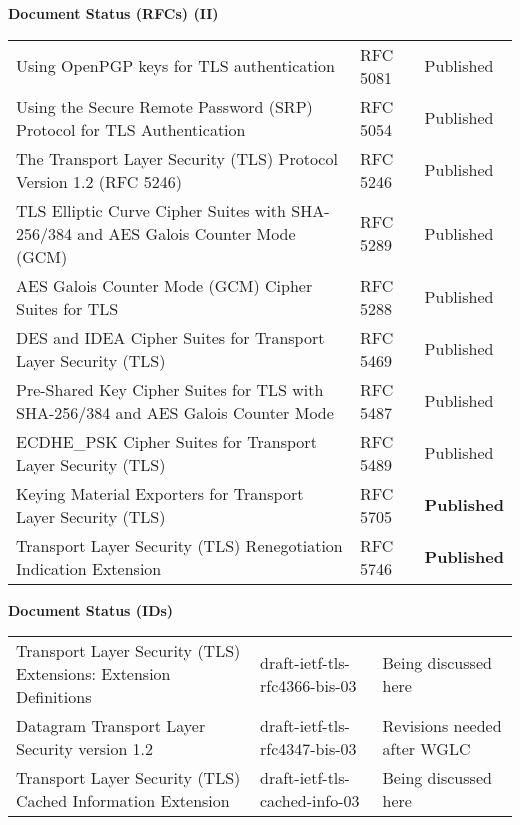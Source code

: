 \documentclass[helvetica]{seminar}
\newcommand{\heading}[1]{%
  \begin{center} 
    \large\bf 
    #1 
  \end{center} 
  \vspace{.4 in}}
\begin{document}
\begin{slide}
\heading{Document Status (RFCs) (II)}

{\tiny
\begin{tabular}{|p{1.5 in}|p{1.4 in}|p{.7 in}|}
\hline
Using OpenPGP keys for TLS authentication  & RFC 5081 & Published \\
Using the Secure Remote Password (SRP) Protocol for TLS Authentication  & RFC 5054 & Published \\
The Transport Layer Security (TLS) Protocol Version 1.2 (RFC 5246) & RFC 5246 & Published \\
TLS Elliptic Curve Cipher Suites with SHA-256/384 and AES Galois Counter Mode (GCM) & RFC 5289 & Published \\
AES Galois Counter Mode (GCM) Cipher Suites for TLS & RFC 5288 & Published \\
DES and IDEA Cipher Suites for Transport Layer Security (TLS) & RFC 5469 & Published \\
Pre-Shared Key Cipher Suites for TLS with SHA-256/384 and AES Galois Counter Mode & RFC 5487 & Published \\
ECDHE\_PSK Cipher Suites for Transport Layer Security (TLS) & RFC 5489 & Published \\
Keying Material Exporters for Transport Layer Security (TLS) & RFC 5705 & \textbf{Published} \\
Transport Layer Security (TLS) Renegotiation Indication Extension & RFC 5746 & \textbf{Published} \\
\hline
\end{tabular}
}
\end{slide}

\begin{slide}
\heading{Document Status (IDs)}

{\tiny
\begin{tabular}{|p{1.5 in}|p{1.4 in}|p{.7 in}|}
\hline
Transport Layer Security (TLS) Extensions: Extension Definitions & draft-ietf-tls-rfc4366-bis-03 & Being discussed here \\
Datagram Transport Layer Security version 1.2 & draft-ietf-tls-rfc4347-bis-03 & {Revisions needed after WGLC} \\
Transport Layer Security (TLS) Cached Information Extension & draft-ietf-tls-cached-info-03 & Being discussed here \\
\hline 
\end{tabular}
}


\end{slide}
\end{document}
